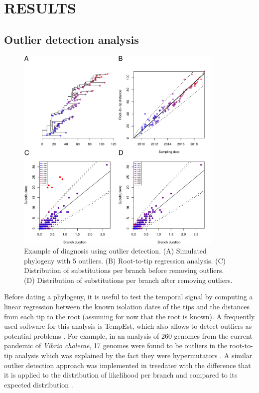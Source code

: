 \documentclass{article}
\begin{document}
\section*{RESULTS}

\subsection*{Outlier detection analysis}

\begin{figure}[p!]
\begin{center}
\includegraphics[width=10cm]{outlier.pdf}
\end{center}
\caption{Example of diagnosis using outlier detection.
(A) Simulated phylogeny with 5 outliers. 
(B) Root-to-tip regression analysis.
(C) Distribution of substitutions per branch before removing outliers.
(D) Distribution of substitutions per branch after removing outliers.
\label{fig:outlier}}
\end{figure}

Before dating a phylogeny, it is useful to test the temporal signal by computing a linear regression
between the known isolation dates of the tips and the distances from each tip to the root 
(assuming for now that the root is known). A frequently used software for this analysis is TempEst,
which also allows to detect outliers as potential problems \citep{Rambaut2016a}. 
For example, in an analysis of 260 genomes from the current pandemic of \textit{Vibrio cholerae},
17 genomes were found to be outliers in the root-to-tip analysis which was 
explained by the fact they were hypermutators \citep{Didelot2015}. A similar outlier detection
approach was implemented in treedater with the difference that it is 
applied to the distribution of likelihood per branch and compared to its expected distribution \citep{Volz2017}.
\end{document}
